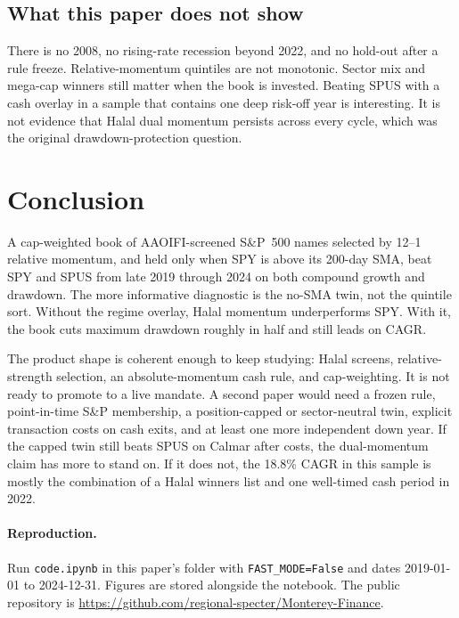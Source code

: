 \documentclass[11pt,letterpaper]{article}
\begin{document}
\subsection{What this paper does not show}

There is no 2008, no rising-rate recession beyond 2022, and no hold-out after a rule freeze. Relative-momentum quintiles are not monotonic. Sector mix and mega-cap winners still matter when the book is invested. Beating SPUS with a cash overlay in a sample that contains one deep risk-off year is interesting. It is not evidence that Halal dual momentum persists across every cycle, which was the original drawdown-protection question.

\section{Conclusion}
\label{sec:conc}

A cap-weighted book of AAOIFI-screened S\&P~500 names selected by 12--1 relative momentum, and held only when SPY is above its 200-day SMA, beat SPY and SPUS from late 2019 through 2024 on both compound growth and drawdown. The more informative diagnostic is the no-SMA twin, not the quintile sort. Without the regime overlay, Halal momentum underperforms SPY. With it, the book cuts maximum drawdown roughly in half and still leads on CAGR.

The product shape is coherent enough to keep studying: Halal screens, relative-strength selection, an absolute-momentum cash rule, and cap-weighting. It is not ready to promote to a live mandate. A second paper would need a frozen rule, point-in-time S\&P membership, a position-capped or sector-neutral twin, explicit transaction costs on cash exits, and at least one more independent down year. If the capped twin still beats SPUS on Calmar after costs, the dual-momentum claim has more to stand on. If it does not, the 18.8\% CAGR in this sample is mostly the combination of a Halal winners list and one well-timed cash period in 2022.

\paragraph{Reproduction.}
Run \texttt{code.ipynb} in this paper's folder with \texttt{FAST\_MODE=False} and dates 2019-01-01 to 2024-12-31. Figures are stored alongside the notebook. The public repository is \url{https://github.com/regional-specter/Monterey-Finance}.
\end{document}

